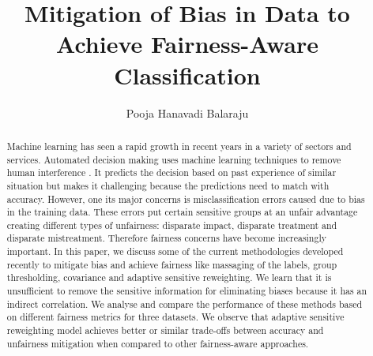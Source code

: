 \documentclass[runningheads]{llncs}
\begin{document}
%
\title{Mitigation of Bias in Data to Achieve Fairness-Aware Classification}

\author{Pooja Hanavadi Balaraju} 
%

%
\maketitle              %
\begin{abstract}
Machine learning has seen a rapid growth in recent years in a variety of sectors and services. Automated decision making uses machine learning techniques to remove human interference . It predicts the decision based on past experience of similar situation but makes it challenging because the predictions need to match with accuracy. However, one its major concerns is misclassification errors caused due to bias in the training data. These errors put certain sensitive groups at an unfair advantage creating different types of unfairness: disparate impact, disparate treatment and disparate mistreatment. Therefore fairness concerns have become increasingly important. In this paper, we discuss some of the current methodologies developed recently to mitigate bias and achieve fairness like massaging of the labels, group thresholding, covariance and adaptive sensitive reweighting. We learn that it is unsufficient to remove the sensitive information for eliminating biases because it has an indirect correlation. We analyse and compare the performance of these methods based on different fairness metrics for three  datasets. We observe that adaptive sensitive reweighting model achieves better or similar trade-offs between accuracy and unfairness mitigation when compared to other fairness-aware approaches.
 

\end{abstract}
\end{document}
